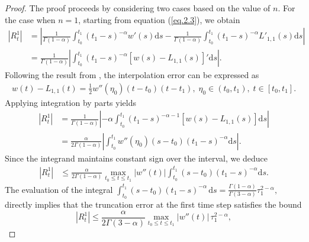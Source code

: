 \documentclass{siamart171218}
\theoremstyle{remark}
\theoremstyle{example}
\numberwithin{equation}{section}
\begin{document}
\begin{proof}
The proof proceeds by considering two cases based on the value of $n$. For the case when $n=1$, starting from equation (\ref{eq.2.3}), we obtain
\begin{align*}
		\left|R_t^1\right|&= \left| \frac{1}{\Gamma(1-\alpha)} \int_{t_0}^{t_1} (t_1 - s)^{-\alpha} w'(s)  \mathrm{d}s - \frac{1}{\Gamma(1-\alpha)} \int_{t_0}^{t_1} (t_1 - s)^{-\alpha} L'_{1,1}(s)  \mathrm{d}s \right| \\
		&= \frac{1}{\Gamma(1-\alpha)} \left| \int_{t_0}^{t_1} (t_1 - s)^{-\alpha} \left[ w(s) - L_{1,1}(s) \right]'  \mathrm{d}s \right|.
	\end{align*}
Following the result from \cite{Gao2014}, the interpolation error can be expressed as
\begin{align*}
w(t)-L_{1,1}(t)=\frac{1}{2}w''(\eta_0)(t-t_0)(t-t_1),\;
 \eta_0\in (t_0,t_1),\;t\in[t_0,t_1].
\end{align*}
Applying integration by parts yields
	\begin{align*}
		\left|R_t^1\right| &= \frac{1}{\Gamma(1-\alpha)} \left| -\alpha \int_{t_0}^{t_1} (t_1 - s)^{-\alpha-1} \left[ w(s) - L_{1,1}(s) \right]  \mathrm{d}s \right| \\
		&= \frac{\alpha}{2\Gamma(1-\alpha)} \left| \int_{t_0}^{t_1} w''(\eta_0) (s - t_0) (t_1 - s)^{-\alpha}  \mathrm{d}s \right|.
	\end{align*}
	Since the integrand maintains constant sign over the interval, we deduce
	\begin{align*}
		\left|R_t^1\right|&\leq \frac{\alpha}{2\Gamma(1-\alpha)} \max_{t_0 \leq t \leq t_1} |w''(t)| \int_{t_0}^{t_1} (s - t_0) (t_1 - s)^{-\alpha}  \mathrm{d}s.
	\end{align*}
The evaluation of the integral
$
\int_{t_0}^{t_1} (s - t_0)(t_1 - s)^{-\alpha} \, \mathrm{d}s = \frac{\Gamma(1-\alpha)}{\Gamma(3-\alpha)} \tau_1^{2-\alpha},
$
directly implies that the truncation error at the first time step satisfies the bound
\[
\left|R_t^1\right| \leq \frac{\alpha}{2\Gamma(3-\alpha)} \max_{t_0 \leq t \leq t_1} |w''(t)| \, \tau_1^{2-\alpha},
\]
	

\end{proof}
\end{document}
